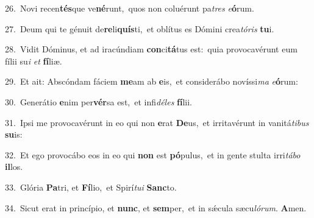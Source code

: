 {\numbfont\textcolor{\numbcolor}{26.}}~Novi recen\-\textbf{tés}\-que ve\-\textbf{né}\-runt,~\star quos non coluérunt pa\textit{tres} \textit{e}\-\textbf{ó}rum.\par
{\numbfont\textcolor{\numbcolor}{27.}}~Deum qui te génuit de\-\textbf{re}\-li\-\textbf{quís}\-ti,~\star et oblítus es Dómini crea\-\textit{tó}\-\textit{ris} \textbf{tu}\-i.\par
{\numbfont\textcolor{\numbcolor}{28.}}~Vidit Dóminus, et ad iracúndiam \textbf{con}\-ci\-\textbf{tá}\-tus est:~\star quia provocavérunt eum fílii su\textit{i} \textit{et} \textbf{fí}\-liæ.\par
{\numbfont\textcolor{\numbcolor}{29.}}~Et ait: Abscóndam fáciem \textbf{me}\-am ab \textbf{e}\-is,~\star et considerábo novíssi\textit{ma} \textit{e}\-\textbf{ó}rum:\par
{\numbfont\textcolor{\numbcolor}{30.}}~Generátio \textbf{e}\-nim per\-\textbf{vér}\-sa est,~\star et infi\-\textit{dé}\-\textit{les} \textbf{fí}\-lii.\par
{\numbfont\textcolor{\numbcolor}{31.}}~Ipsi me provocavérunt in eo qui non \textbf{e}\-rat \textbf{De}\-us,~\star et irritavérunt in vanitá\-\textit{ti}\-\textit{bus} \textbf{su}\-is:\par
{\numbfont\textcolor{\numbcolor}{32.}}~Et ego provocábo eos in eo qui \textbf{non} est \textbf{pó}\-pulus,~\star et in gente stulta irri\-\textit{tá}\-\textit{bo} \textbf{il}\-los.\par
{\numbfont\textcolor{\numbcolor}{33.}}~Glória \textbf{Pa}\-tri, et \textbf{Fí}\-lio,~\star et Spirí\-\textit{tu}\-\textit{i} \textbf{Sanc}\-to.\par
{\numbfont\textcolor{\numbcolor}{34.}}~Sicut erat in princípio, et \textbf{nunc}\-, et \textbf{sem}\-per,~\star et in sǽcula sæcu\-\textit{ló}\-\textit{rum}. \textbf{A}\-men.\par
